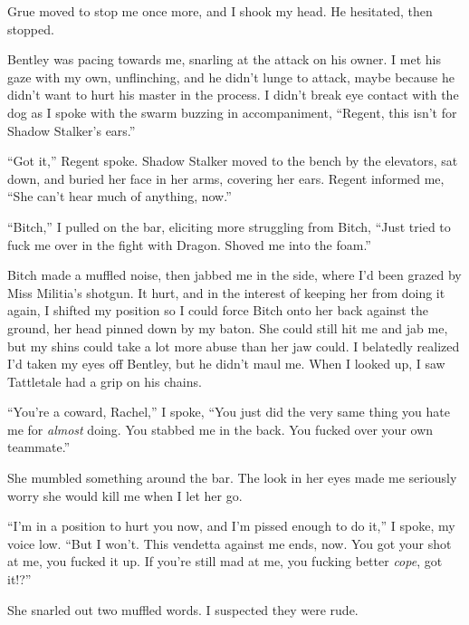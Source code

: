 Grue moved to stop me once more, and I shook my head.  He hesitated, then stopped.



Bentley was pacing towards me, snarling at the attack on his owner.  I met his gaze with my own, unflinching, and he didn't lunge to attack, maybe because he didn't want to hurt his master in the process.  I didn't break eye contact with the dog as I spoke with the swarm buzzing in accompaniment, ``Regent, this isn't for Shadow Stalker's ears.''



``Got it,'' Regent spoke.  Shadow Stalker moved to the bench by the elevators, sat down, and buried her face in her arms, covering her ears.  Regent informed me, ``She can't hear much of anything, now.''



``Bitch,'' I pulled on the bar, eliciting more struggling from Bitch, ``Just tried to fuck me over in the fight with Dragon.  Shoved me into the foam.''



Bitch made a muffled noise, then jabbed me in the side, where I'd been grazed by Miss Militia's shotgun.  It hurt, and in the interest of keeping her from doing it again, I shifted my position so I could force Bitch onto her back against the ground, her head pinned down by my baton.  She could still hit me and jab me, but my shins could take a lot more abuse than her jaw could.  I belatedly realized I'd taken my eyes off Bentley, but he didn't maul me.  When I looked up, I saw Tattletale had a grip on his chains.



``You're a coward, Rachel,'' I spoke, ``You just did the very same thing you hate me for \emph{almost} doing.  You stabbed me in the back.  You fucked over your own teammate.''



She mumbled something around the bar.  The look in her eyes made me seriously worry she would kill me when I let her go.



``I'm in a position to hurt you now, and I'm pissed enough to do it,'' I spoke, my voice low.  ``But I won't.  This vendetta against me ends, now.  You got your shot at me, you fucked it up.  If you're still mad at me, you fucking better\emph{ cope}, got it!?''



She snarled out two muffled words.  I suspected they were rude.



